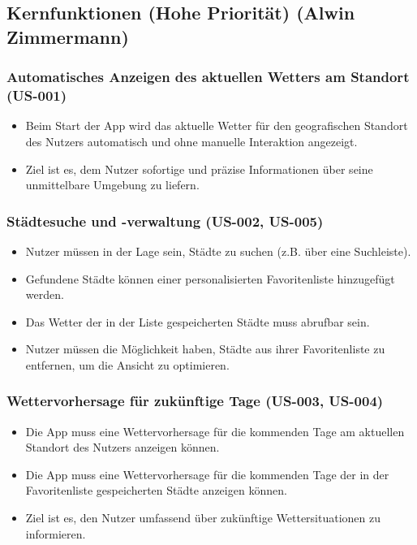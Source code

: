 \documentclass{article}
\begin{document}
\subsection{Kernfunktionen (Hohe Priorität) \small{(Alwin Zimmermann)}}

\subsubsection{Automatisches Anzeigen des aktuellen Wetters am Standort (US-001)}
\begin{itemize}
    \item Beim Start der App wird das aktuelle Wetter für den geografischen Standort des Nutzers automatisch und ohne manuelle Interaktion angezeigt.
    \item Ziel ist es, dem Nutzer sofortige und präzise Informationen über seine unmittelbare Umgebung zu liefern.
\end{itemize}

\subsubsection{Städtesuche und -verwaltung (US-002, US-005)}
\begin{itemize}
    \item Nutzer müssen in der Lage sein, Städte zu suchen (z.B. über eine Suchleiste).
    \item Gefundene Städte können einer personalisierten Favoritenliste hinzugefügt werden.
    \item Das Wetter der in der Liste gespeicherten Städte muss abrufbar sein.
    \item Nutzer müssen die Möglichkeit haben, Städte aus ihrer Favoritenliste zu entfernen, um die Ansicht zu optimieren.
\end{itemize}

\subsubsection{Wettervorhersage für zukünftige Tage (US-003, US-004)}
\begin{itemize}
    \item Die App muss eine Wettervorhersage für die kommenden Tage am aktuellen Standort des Nutzers anzeigen können.
    \item Die App muss eine Wettervorhersage für die kommenden Tage der in der Favoritenliste gespeicherten Städte anzeigen können.
    \item Ziel ist es, den Nutzer umfassend über zukünftige Wettersituationen zu informieren.
\end{itemize}
\end{document}
